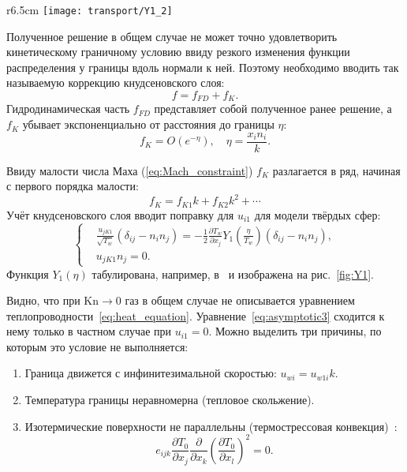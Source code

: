 \documentclass[english,russian,a4paper,10pt]{article}
\newcommand{\Kn}{\mathrm{Kn}}
\newcommand{\pder}[2][]{\frac{\partial#1}{\partial#2}}
\begin{document}
\begin{wrapfigure}{r}{6.5cm}
	\vspace{-10pt}
	\texttt{[image: transport/Y1\_2]}
	\vspace{-20pt}
	\caption{Функция \(Y_1(\eta)\) кнудсеновского слоя для модели твёрдых сфер}\label{fig:Y1}
	\vspace{5pt}
\end{wrapfigure}

Полученное решение в общем случае не может точно удовлетворить кинетическому граничному условию
ввиду резкого изменения функции распределения у границы вдоль нормали к ней.
Поэтому необходимо вводить так называемую коррекцию кнудсеновского слоя:
\begin{equation}
	f = f_{FD} + f_K.
\end{equation}
Гидродинамическая часть \(f_{FD}\) представляет собой полученное ранее решение,
а \(f_K\) убывает экспоненциально от расстояния до границы \(\eta\):
\begin{equation}
	f_K = O\left(e^{-\eta}\right), \quad \eta = \frac{x_in_i}k.
\end{equation}

Ввиду малости числа Маха (\ref{eq:Mach_constraint}) \(f_K\) разлагается в ряд, начиная с первого порядка малости:
\[ f_K = f_{K1}k + f_{K2}k^2 + \cdots \]
Учёт кнудсеновского слоя вводит поправку для \(u_{i1}\) для модели твёрдых сфер:
\begin{equation}
	\left\{
	\begin{aligned}
		& \frac{u_{jK1}}{\sqrt{T_w}}(\delta_{ij}-n_in_j) = 
			-\frac12\pder[T_w]{x_j} Y_1\left(\frac\eta{T_w}\right) (\delta_{ij}-n_in_j), \\
		& u_{jK1}n_j = 0.
	\end{aligned}
	\right. \label{eq:bound:v_K}
\end{equation}
Функция \(Y_1(\eta)\) табулирована, например, в~\cite{Sone2002, Sone2007} и изображена на рис.~\ref{fig:Y1}.

Видно, что при \(\Kn\to0\) газ в общем случае не описывается уравнением теплопроводности~\eqref{eq:heat_equation}.
Уравнение~\eqref{eq:asymptotic3} сходится к нему только в частном случае при \(u_{i1} = 0\).
Можно выделить три причины, по которым это условие не выполняется:
\begin{enumerate}
	\item Граница движется с инфинитезимальной скоростью: \(u_{wi} = u_{w1i}k\).
	\item Температура границы неравномерна (тепловое скольжение).
	\item Изотермические поверхности не параллельны (термострессовая конвекция)~\cite{Kogan1976}:
		\begin{equation}\label{eq:equilibrium}
			e_{ijk}\pder[T_0]{x_j}\pder{x_k}\left(\pder[T_0]{x_l}\right)^2 = 0.
		\end{equation}
\end{enumerate}
\end{document}
